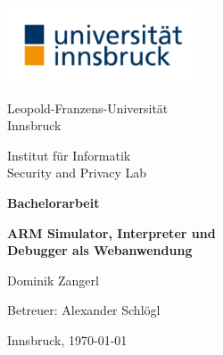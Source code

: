 \documentclass[a4paper, 11pt, onecolumn]{article}
\begin{document}
\renewcommand{\abstractname}{Kurzfassung}
	\begin{titlepage}
		\begin{minipage}{0.45\textwidth}
   			\includegraphics[width=5.7cm]{data/uibk}
		\end{minipage}
		\begin{minipage}{0.5\textwidth}
 			\begin{flushright}
 				\Large
     			Leopold-Franzens-Universität\\ Innsbruck\\
      		\end{flushright}
		\end{minipage}
  
		\begin{flushright}
			\vspace{0.5cm}  
			      
		    \large     
	        Institut für Informatik\\
			Security and Privacy Lab        
	        
			\vspace{2cm}        
	        
	        \Large \textbf{Bachelorarbeit}

			\vspace{1cm}     
	        
			\LARGE
	        \textbf{ARM Simulator, Interpreter und\\Debugger als Webanwendung\\}

			\vspace{1cm}   
			
			\Large  
	        Dominik Zangerl
	        
	        \vspace{4cm}   
			Betreuer: Alexander Schlögl  
	                
	        \vspace{7cm}
	        
	        \large    
	        Innsbruck, \today
           
    	\end{flushright}
    \end{titlepage}
    
\end{document}
